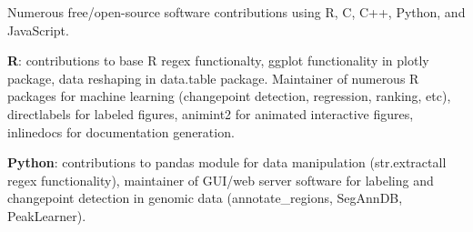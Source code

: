 \documentclass[margin,line]{res}
\begin{document}
\begin{resume}
Numerous free/open-source software contributions using R, C, C++,
Python, and JavaScript. %

{\bf R}: contributions to base R regex functionalty, ggplot
functionality in plotly package, data reshaping in data.table
package. Maintainer of numerous R packages for machine learning
(changepoint detection, regression, ranking, etc), directlabels for
labeled figures, animint2 for animated interactive figures, inlinedocs
for documentation generation.

{\bf Python}: contributions to pandas module for data manipulation
(str.extractall regex functionality), maintainer of GUI/web server
software for labeling and changepoint detection in genomic data
(annotate\_regions, SegAnnDB, PeakLearner).

\begin{comment}
\pagebreak

\section{\sc References}

\noindent {\bf Francis Bach}\\
Scientific Leader,
SIERRA Project-Team\\
Institut National de Recherche en Informatique et en Automatique\\
E-mail: francis.bach@ens.fr\\
Webpage: \url{http://www.di.ens.fr/~fbach}

\noindent {\bf Michael Friedlander}\\
Associate Professor,
Department of Computer Science\\
University of British Columbia\\
E-mail: mpf@cs.ubc.ca\\
Webpage: http://www.cs.ubc.ca/$\sim$mpf

\noindent {\bf Kevin Murphy}\\
Research Scientist,
Google\\
E-mail: murphyk@gmail.com\\
Webpage: http://www.cs.ubc.ca/$\sim$murphyk



\end{comment}
\end{resume}
\end{document}
